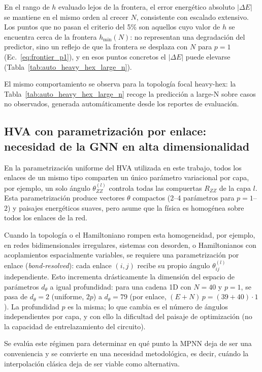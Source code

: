 \documentclass[11pt,a4paper,spanish]{book}
\begin{document}
En el rango de $h$ evaluado lejos de la frontera, el error energético absoluto $|\Delta E|$ se mantiene en el mismo orden al crecer $N$, consistente con escalado extensivo. Los puntos que no pasan el criterio del 5\% son aquellos cuyo valor de $h$ se encuentra cerca de la frontera $h_{\min}(N)$: no representan una degradación del predictor, sino un reflejo de que la frontera se desplaza con $N$ para $p = 1$ (Ec.~\ref{eq:frontier_p1}), y en esos puntos concretos el $|\Delta E|$ puede elevarse (Tabla~\ref{tab:auto_heavy_hex_large_n}).

El mismo comportamiento se observa para la topología focal heavy-hex: la Tabla~\ref{tab:auto_heavy_hex_large_n} recoge la predicción a large-N sobre casos no observados, generada automáticamente desde los reportes de evaluación.



\subsection{HVA con parametrización por enlace: necesidad de la GNN en alta dimensionalidad}
\label{subsec:bond_resolved}

En la parametrización uniforme del HVA utilizada en este trabajo, todos los enlaces de un mismo tipo comparten un único parámetro variacional por capa, por ejemplo, un solo ángulo $\theta_{ZZ}^{(l)}$ controla todas las compuertas $R_{ZZ}$ de la capa $l$. Esta parametrización produce vectores $\theta$ compactos (2--4 parámetros para $p = 1$--$2$) y paisajes energéticos suaves, pero asume que la física es homogénea sobre todos los enlaces de la red.

Cuando la topología o el Hamiltoniano rompen esta homogeneidad, por ejemplo, en redes bidimensionales irregulares, sistemas con desorden, o Hamiltonianos con acoplamientos espacialmente variables, se requiere una parametrización por enlace (\emph{bond-resolved}): cada enlace $(i,j)$ recibe su propio ángulo $\theta_{ij}^{(l)}$ independiente. Esto incrementa drásticamente la dimensión del espacio de parámetros $d_\theta$ a igual profundidad: para una cadena 1D con $N = 40$ y $p = 1$, se pasa de $d_\theta = 2$ (uniforme, $2p$) a $d_\theta = 79$ (por enlace, $(E + N)\,p = (39 + 40) \cdot 1$). La profundidad $p$ es la misma; lo que cambia es el número de ángulos independientes por capa, y con ello la dificultad del paisaje de optimización (no la capacidad de entrelazamiento del circuito).

Se evalúa este régimen para determinar en qué punto la MPNN deja de ser una conveniencia y se convierte en una necesidad metodológica, es decir, cuándo la interpolación clásica deja de ser viable como alternativa.
\end{document}
